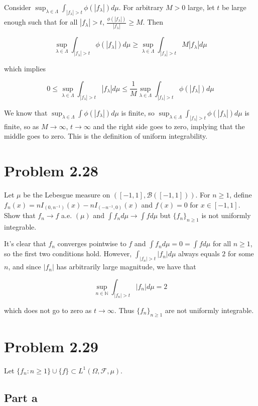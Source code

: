 \documentclass{article}
\newcommand{\N}{\mathbb{N}}
\newcommand{\F}{\mathcal{F}}
\newcommand{\B}{\mathcal{B}}
\begin{document}
Consider $\sup_{\lambda \in \Lambda} \int_{|f_\lambda|>t} \phi(|f_\lambda|)d\mu$. For arbitrary $M>0$ large, let $t$ be large enough such that for all $|f_\lambda| > t$, $\frac{\phi(|f_\lambda|)}{|f_\lambda|} \geq M$. Then

\[
\sup_{\lambda \in \Lambda} \int_{|f_\lambda|>t} \phi(|f_\lambda|)d\mu \geq \sup_{\lambda \in \Lambda} \int_{|f_\lambda|>t}M|f_\lambda| d\mu
\]

which implies

\[
0 \leq \sup_{\lambda \in \Lambda} \int_{|f_\lambda|>t}|f_\lambda| d\mu \leq \frac{1}{M}\sup_{\lambda \in \Lambda} \int_{|f_\lambda|>t} \phi(|f_\lambda|)d\mu
\]

We know that $\sup_{\lambda \in \Lambda} \int \phi(|f_\lambda|)d\mu$ is finite, so $\sup_{\lambda \in \Lambda} \int_{|f_\lambda|>t} \phi(|f_\lambda|)d\mu$ is finite, so as $M \rightarrow \infty$, $t \rightarrow \infty$ and the right side goes to zero, implying that the middle goes to zero. This is the definition of uniform integrability.

\section*{Problem 2.28}

Let $\mu$ be the Lebesgue measure on $([-1,1], \B([-1,1]))$. For $n \geq 1$, define $f_n(x) = nI_{(0,n^{-1})}(x) - nI_{(-n^{-1},0)}(x)$ and $f(x) = 0$ for $x \in [-1, 1]$. Show that $f_n \rightarrow f$ a.e. $(\mu)$ and $\int f_n d\mu \rightarrow \int fd\mu$ but $\{f_n\}_{n \geq 1}$ is not uniformly integrable.

It's clear that $f_n$ converges pointwise to $f$ and $\int f_nd\mu = 0 = \int fd\mu$ for all $n \geq 1$, so the first two conditions hold. However, $\int_{|f_n|>t} |f_n|d\mu$ always equals $2$ for some $n$, and since $|f_n|$ has arbitrarily large magnitude, we have that

\[
\sup_{n \in \N} \int_{|f_n|>t} |f_n|d\mu = 2
\]

which does not go to zero as $t \rightarrow \infty$. Thus $\{f_n\}_{n \geq 1}$ are not uniformly integrable.

\section*{Problem 2.29}

Let $\{f_n: n \geq 1\} \cup \{f\} \subset L^1(\Omega, \F, \mu)$.

\subsection*{Part a}
\end{document}
